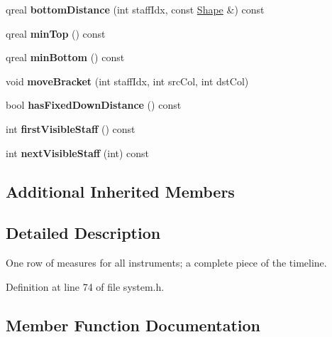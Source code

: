 \begin{DoxyCompactItemize}
\item 
\mbox{\label{class_ms_1_1_system_a858f120e484fe9468518f986edced57c}} 
qreal {\bfseries bottom\+Distance} (int staff\+Idx, const \hyperlink{class_ms_1_1_shape}{Shape} \&) const
\item 
\mbox{\label{class_ms_1_1_system_a52625ec0f97574d5fc64b2d4dec64f9f}} 
qreal {\bfseries min\+Top} () const
\item 
\mbox{\label{class_ms_1_1_system_aad9535273017c27595ea5aeb0b3baf38}} 
qreal {\bfseries min\+Bottom} () const
\item 
\mbox{\label{class_ms_1_1_system_ab6bfe354d18bc804a17f39690ed587c8}} 
void {\bfseries move\+Bracket} (int staff\+Idx, int src\+Col, int dst\+Col)
\item 
\mbox{\label{class_ms_1_1_system_aa562355bd9ceb1065284da1e2a19cc9c}} 
bool {\bfseries has\+Fixed\+Down\+Distance} () const
\item 
\mbox{\label{class_ms_1_1_system_a7d2a3a40bb9f87be831540f0258e95df}} 
int {\bfseries first\+Visible\+Staff} () const
\item 
\mbox{\label{class_ms_1_1_system_a2c3bd9ec57fc55b441188dc2d6f21eea}} 
int {\bfseries next\+Visible\+Staff} (int) const
\end{DoxyCompactItemize}
\subsection*{Additional Inherited Members}


\subsection{Detailed Description}
One row of measures for all instruments; a complete piece of the timeline. 

Definition at line 74 of file system.\+h.



\subsection{Member Function Documentation}
\mbox{\label{class_ms_1_1_system_a630eb061f651b37400274e180f12cc62}} 
